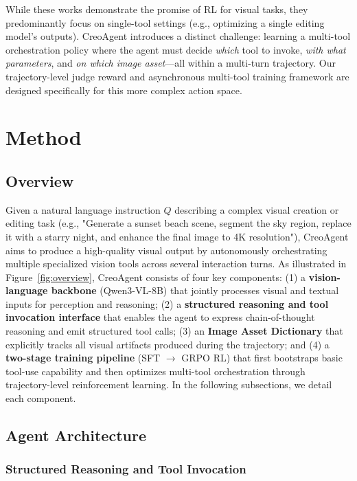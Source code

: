 \documentclass{article}
\begin{document}
While these works demonstrate the promise of RL for visual tasks, they predominantly focus on single-tool settings (e.g., optimizing a single editing model's outputs). CreoAgent introduces a distinct challenge: learning a multi-tool orchestration policy where the agent must decide \textit{which} tool to invoke, \textit{with what parameters}, and \textit{on which image asset}—all within a multi-turn trajectory. Our trajectory-level judge reward and asynchronous multi-tool training framework are designed specifically for this more complex action space.


\section{Method}

\subsection{Overview}

Given a natural language instruction $Q$ describing a complex visual creation or editing task (e.g., "Generate a sunset beach scene, segment the sky region, replace it with a starry night, and enhance the final image to 4K resolution"), CreoAgent aims to produce a high-quality visual output by autonomously orchestrating multiple specialized vision tools across several interaction turns. As illustrated in Figure~\ref{fig:overview}, CreoAgent consists of four key components: (1) a \textbf{vision-language backbone} (Qwen3-VL-8B) that jointly processes visual and textual inputs for perception and reasoning; (2) a \textbf{structured reasoning and tool invocation interface} that enables the agent to express chain-of-thought reasoning and emit structured tool calls; (3) an \textbf{Image Asset Dictionary} that explicitly tracks all visual artifacts produced during the trajectory; and (4) a \textbf{two-stage training pipeline} (SFT $\rightarrow$ GRPO RL) that first bootstraps basic tool-use capability and then optimizes multi-tool orchestration through trajectory-level reinforcement learning. In the following subsections, we detail each component.

\subsection{Agent Architecture}

\subsubsection{Structured Reasoning and Tool Invocation}
\end{document}
